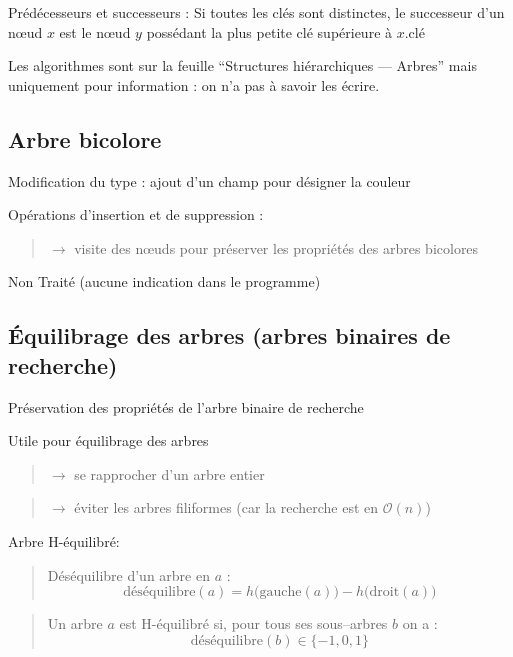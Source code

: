 Prédécesseurs et successeurs : Si toutes les clés sont distinctes, le
successeur d'un nœud \(x\) est le nœud \(y\) possédant la plus petite
clé supérieure à \(x\).clé

Les algorithmes sont sur la feuille ``Structures hiérarchiques ---
Arbres'' mais uniquement pour information : on n'a pas à savoir les
écrire.

\hypertarget{arbre-bicolore}{%
\subsection{Arbre bicolore}\label{arbre-bicolore}}

Modification du type : ajout d'un champ pour désigner la couleur

Opérations d'insertion et de suppression :

\begin{quote}
\(\to\) visite des nœuds pour préserver les propriétés des arbres
bicolores
\end{quote}

\large\sc Non Traité
\normalsize\rm (aucune indication dans le programme)

\hypertarget{uxe9quilibrage-des-arbres-arbres-binaires-de-recherche}{%
\subsection{Équilibrage des arbres (arbres binaires de
recherche)}\label{uxe9quilibrage-des-arbres-arbres-binaires-de-recherche}}

Préservation des propriétés de l'arbre binaire de recherche

Utile pour équilibrage des arbres

\begin{quote}
\(\to\) se rapprocher d'un arbre entier
\end{quote}

\begin{quote}
\(\to\) éviter les arbres filiformes (car la recherche est en
\(\mathcal{O}(n)\))
\end{quote}

Arbre H-équilibré:

\begin{quote}
Déséquilibre d'un arbre en \(a\) : \[
\mathrm{déséquilibre}(a) = h\big(\mathrm{gauche}(a)\big) - h\big(\mathrm{droit}(a)\big)
\]
\end{quote}

\begin{quote}
Un arbre \(a\) est H-équilibré si, pour tous ses sous--arbres \(b\) on a
: \[
\mathrm{déséquilibre}(b)\in\{-1,0,1\}
\]
\end{quote}

